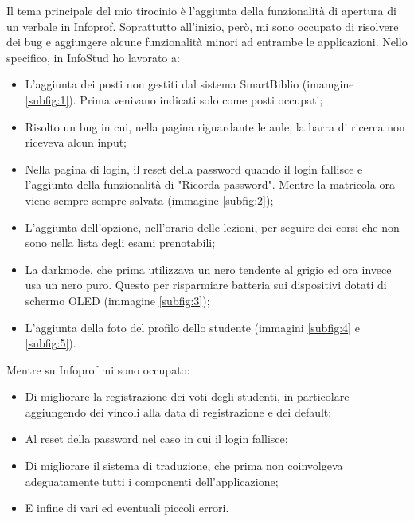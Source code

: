 \documentclass[Lau, oneside, noexaminfo]{sapthesis}%
\begin{document}

Il tema principale del mio tirocinio è l'aggiunta della funzionalità di apertura di un verbale in Infoprof. Soprattutto all'inizio, però, mi sono occupato di risolvere dei bug e aggiungere alcune funzionalità minori ad entrambe le applicazioni. Nello specifico, in InfoStud ho lavorato a:
\begin{itemize}
	\item L'aggiunta dei posti non gestiti dal sistema SmartBiblio (imamgine \ref{subfig:1}). Prima venivano indicati solo come posti occupati;
	\item Risolto un bug in cui, nella pagina riguardante le aule, la barra di ricerca non riceveva alcun input;
	\item Nella pagina di login, il reset della password quando il login fallisce e l'aggiunta della funzionalità di "Ricorda password". Mentre la matricola ora viene sempre sempre salvata
	(immagine \ref{subfig:2});
	\item L'aggiunta dell'opzione, nell'orario delle lezioni, per seguire dei corsi che non sono nella lista degli esami prenotabili;
	\item La darkmode, che prima utilizzava un nero tendente al grigio ed ora invece usa un nero puro. Questo per risparmiare batteria sui dispositivi dotati di schermo OLED (immagine \ref{subfig:3});
	\item L'aggiunta della foto del profilo dello studente (immagini \ref{subfig:4} e \ref{subfig:5}).
\end{itemize}

Mentre su Infoprof mi sono occupato:
\begin{itemize}
	\item Di migliorare la registrazione dei voti degli studenti, in particolare aggiungendo dei vincoli alla data di registrazione e dei default;
	\item Al reset della password nel caso in cui il login fallisce;
	\item Di migliorare il sistema di traduzione, che prima non coinvolgeva adeguatamente tutti i componenti dell'applicazione;
	\item E infine di vari ed eventuali piccoli errori.
\end{itemize}
\end{document}
